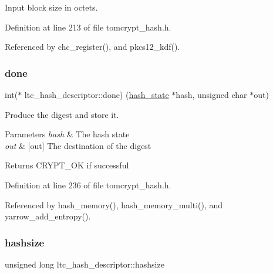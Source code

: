 Input block size in octets. 



Definition at line 213 of file tomcrypt\+\_\+hash.\+h.



Referenced by chc\+\_\+register(), and pkcs12\+\_\+kdf().

\mbox{\label{structltc__hash__descriptor_a97978ff7b1c57c7e3c8b9a416f1226ed}} 
\subsubsection{\texorpdfstring{done}{done}}
{\footnotesize\ttfamily int($\ast$ ltc\+\_\+hash\+\_\+descriptor\+::done) (\mbox{\hyperlink{tomcrypt__hash_8h_af5d2e619794bf148fceb9332d3fcece6}{hash\+\_\+state}} $\ast$hash, unsigned char $\ast$out)}



Produce the digest and store it. 


\begin{DoxyParams}{Parameters}
{\em hash} & The hash state \\
\hline
{\em out} & \mbox{[}out\mbox{]} The destination of the digest \\
\hline
\end{DoxyParams}
\begin{DoxyReturn}{Returns}
C\+R\+Y\+P\+T\+\_\+\+OK if successful 
\end{DoxyReturn}


Definition at line 236 of file tomcrypt\+\_\+hash.\+h.



Referenced by hash\+\_\+memory(), hash\+\_\+memory\+\_\+multi(), and yarrow\+\_\+add\+\_\+entropy().

\mbox{\label{structltc__hash__descriptor_a49bd027653ff21408cb2661748d719ef}} 
\subsubsection{\texorpdfstring{hashsize}{hashsize}}
{\footnotesize\ttfamily unsigned long ltc\+\_\+hash\+\_\+descriptor\+::hashsize}



